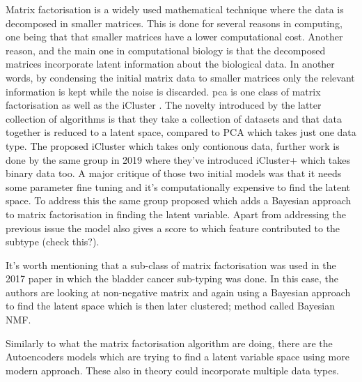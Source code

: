 Matrix factorisation is a widely used mathematical technique where the data is decomposed in smaller matrices. This is done for several reasons in computing, one being that that smaller matrices have a lower computational cost. Another reason, and the main one in computational biology is that the decomposed matrices incorporate latent information about the biological data. In another words, by condensing the initial matrix data to smaller matrices only the relevant information is kept while the noise is discarded. \acrlong{pca} is one class of matrix factorisation as well as the iCluster \cite{Shen2009-ew, Shen2012-yj, Mo2018-el}. The novelty introduced by the latter collection of algorithms is that they take a collection of datasets and that data together is reduced to a latent space, compared to PCA which takes just one data type. The \citet{Shen2009-ew} proposed iCluster which takes only contionous data, further work is done by the same group in 2019 \citet{Shen2012-yj} where they've introduced iCluster+ which takes binary data too. A major critique of those two initial models was that it needs some parameter fine tuning and it's computationally expensive to find the latent space. To address this the same group proposed \citet{Mo2018-el} which adds a Bayesian approach to matrix factorisation in finding the latent variable. Apart from addressing the previous issue the model also gives a score to which feature contributed to the subtype (check this?).

It's worth mentioning that a sub-class of matrix factorisation was used in the 2017 paper \citet{Robertson2017-mg} in which the bladder cancer sub-typing was done. In this case, the authors are looking at non-negative matrix and again using a Bayesian approach to find the latent space which is then later clustered; method called Bayesian NMF.

Similarly to what the matrix factorisation algorithm are doing, there are the Autoencoders models which are trying to find a latent variable space using more modern approach. These also in theory could incorporate multiple data types.